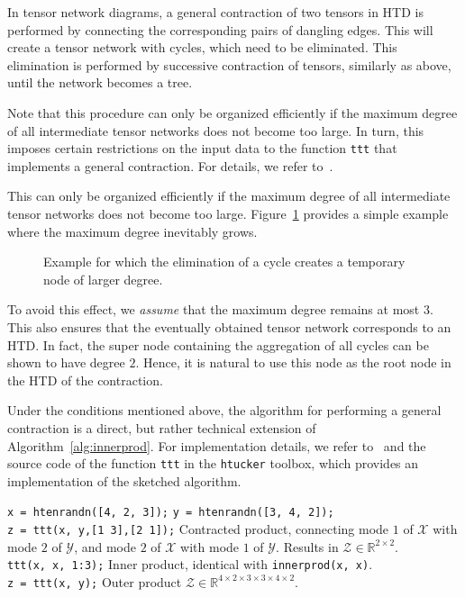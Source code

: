 \documentclass[11pt, a4paper]{article}
\newcommand{\calX}{\mathcal{X}}
\newcommand{\calY}{\mathcal{Y}}
\newcommand{\calZ}{\mathcal{Z}}
\newcommand{\R}{{\mathbb R}}
\begin{document}
In tensor network diagrams, a general contraction of two tensors in HTD 
is performed by connecting the corresponding pairs of dangling edges. This
will create a tensor network with cycles, which need to be eliminated.
This elimination is performed by successive contraction of tensors, similarly
as above, until the network becomes a tree.
\begin{submitted}
 Note that this procedure can only be organized efficiently if 
the maximum degree of all intermediate tensor networks does not become too large.
In turn, this imposes certain restrictions on the input data to the function {\tt ttt}
that implements a general contraction. For details, we refer to~\cite[Sec. 3.5.2]{Tob12}.
\end{submitted}
\begin{preprint}
 This can only be organized efficiently if 
the maximum degree of all intermediate tensor networks does not become too large.
Figure~\ref{fig:excessivedegree} provides a simple example where the maximum degree
inevitably grows.
\begin{figure}
\begin{center}
\resizebox{9cm}{!}{}
  \end{center}
  \caption{Example for which the elimination of a cycle creates a temporary node of larger degree.}
  \label{fig:excessivedegree}
\end{figure}
To avoid this effect, we \emph{assume} that the maximum degree remains at most $3$.
This also ensures that the eventually obtained tensor network 
corresponds to an HTD. In fact, the super node 
containing the aggregation of all cycles can be shown to have degree $2$. Hence, it is natural
to use this node as the root node in the HTD of the contraction.

Under the conditions mentioned above, the algorithm for performing a general contraction is a direct, but rather technical extension
of Algorithm~\ref{alg:innerprod}. For implementation details, we refer to~\cite[Sec. 3.5.2]{Tob12} and the source code of the function \texttt{ttt}
in the \texttt{htucker} toolbox, which provides an implementation of the sketched algorithm.
\begin{framed} \noindent
\noindent
  \texttt{x = htenrandn([4, 2, 3]);} \texttt{y = htenrandn([3, 4, 2]);} \\
  \texttt{z = ttt(x, y,[1 3],[2 1]);} Contracted product, connecting
  mode $1$ of $\calX$ with mode $2$ of $\calY$, and
  mode $2$ of $\calX$ with mode $1$ of $\calY$. Results in $\calZ \in \R^{2 \times 2}$. \\
  \texttt{ttt(x, x, 1:3);} Inner product, identical with \texttt{innerprod(x, x)}.\\
  \texttt{z = ttt(x, y);} Outer product $\calZ \in \R^{4 \times 2 \times 3 \times 3 \times 4 \times 2}$.
\end{framed}
\end{preprint}
\end{document}
